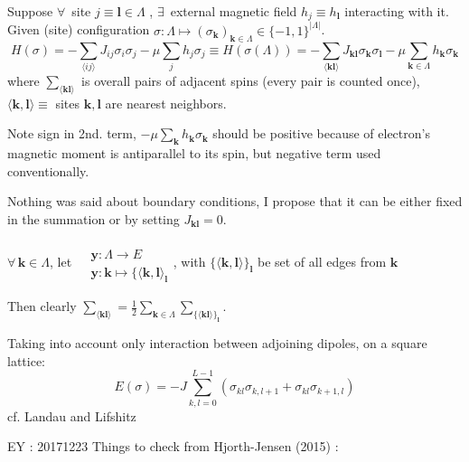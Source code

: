 Suppose $\forall \, $ site $j \equiv \mathbf{l} \in \Lambda$ , $\exists \, $ external magnetic field $h_j \equiv h_{\mathbf{l}}$ interacting with it.  \\
Given (site) configuration $\sigma : \Lambda \mapsto (\sigma_{\mathbf{k}})_{\mathbf{k} \in \Lambda} \in \lbrace -1 ,1 \rbrace^{ | \Lambda | }$.  
\begin{equation}
H(\sigma) = -\sum_{ \langle i j \rangle } J_{ij} \sigma_i \sigma_j - \mu \sum_j h_j \sigma_j \equiv H(\sigma(\Lambda)) = -\sum_{\langle \mathbf{k} \mathbf{l} \rangle } J_{\mathbf{k} \mathbf{l} }\sigma_{\mathbf{k}} \sigma_{\mathbf{l}} - \mu \sum_{ \mathbf{k} \in \Lambda } h_{\mathbf{k}} \sigma_{ \mathbf{k}}
\end{equation}
where $\sum_{ \langle \mathbf{k} \mathbf{l} \rangle }$ is overall pairs of adjacent spins (every pair is counted once),  \\
\phantom{where } $\langle \mathbf{k}, \mathbf{l} \rangle \equiv $ sites $\mathbf{k}, \mathbf{l}$ are nearest neighbors.  

Note sign in 2nd. term, $-\mu \sum_{\mathbf{k}} h_{\mathbf{k}} \sigma_{\mathbf{k}}$ should be positive because of electron's magnetic moment is antiparallel to its spin, but negative term used conventionally.  

Nothing was said about boundary conditions, I propose that it can be either fixed in the summation or by setting $J_{\mathbf{k} \mathbf{l}}=0$.  

$\forall \, \mathbf{k} \in \Lambda$, let $\begin{aligned} & \quad \\
	& \mathbf{y} : \Lambda \to E \\ 
		& \mathbf{y}: \mathbf{k} \mapsto \lbrace \langle \mathbf{k}, \mathbf{l} \rangle_{\mathbf{l}} \end{aligned}$, with $\lbrace \langle \mathbf{k}, \mathbf{l} \rangle \rbrace_{\mathbf{l}}$ be set of all edges from $\mathbf{k}$
		
		Then clearly $\sum_{\langle \mathbf{k} \mathbf{l} \rangle } = \frac{1}{2} \sum_{\mathbf{k} \in \Lambda} \sum_{ \lbrace \langle \mathbf{k} \mathbf{l} \rangle \rbrace_{\mathbf{l}}}$.  
		
		
Taking into account only interaction between adjoining dipoles, on a square lattice: 
\[
E(\sigma) = -J \sum_{k,l=0}^{L-1} ( \sigma_{kl}\sigma_{k,l+1} + \sigma_{kl} \sigma_{k+1, l} )
\]
cf. Landau and Lifshitz \cite{agat:LaLi1980}


EY : 20171223 Things to check from Hjorth-Jensen (2015) \cite{agat:Hjor2015}:  

